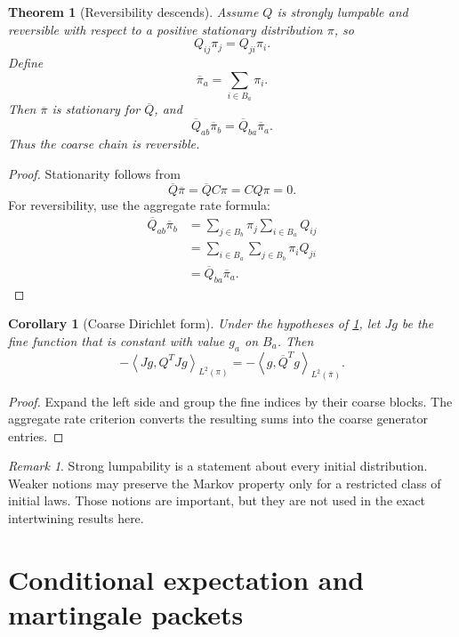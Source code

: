 \documentclass{aomart}
\newtheorem{theorem}{Theorem}[section]
\newtheorem{corollary}[corollary]{Corollary}
\theoremstyle{definition}
\theoremstyle{remark}
\newtheorem{remark}[remark]{Remark}
\newcommand{\ip}[2]{\left\langle#1,#2\right\rangle}
\begin{document}
\begin{theorem}[Reversibility descends]\label{thm:reversibility_descends}
Assume \(Q\) is strongly lumpable and reversible with respect to a positive stationary distribution \(\pi\), so
\[
Q_{ij}\pi_j=Q_{ji}\pi_i.
\]
Define
\[
\overline\pi_a=\sum_{i\in B_a}\pi_i.
\]
Then \(\overline\pi\) is stationary for \(\overline Q\), and
\[
\overline Q_{ab}\overline\pi_b
=
\overline Q_{ba}\overline\pi_a.
\]
Thus the coarse chain is reversible.
\end{theorem}

\begin{proof}
Stationarity follows from
\[
\overline Q\overline\pi
=\overline QC\pi
=CQ\pi=0.
\]
For reversibility, use the aggregate rate formula:
\[
\begin{aligned}
\overline Q_{ab}\overline\pi_b
&=\sum_{j\in B_b}\pi_j\sum_{i\in B_a}Q_{ij}\\
&=\sum_{i\in B_a}\sum_{j\in B_b}\pi_iQ_{ji}\\
&=\overline Q_{ba}\overline\pi_a.
\end{aligned}
\]
\end{proof}

\begin{corollary}[Coarse Dirichlet form]\label{cor:coarse_dirichlet_form}
Under the hypotheses of \cref{thm:reversibility_descends}, let \(Jg\) be the fine function that is constant with value \(g_a\) on \(B_a\). Then
\[
-\ip{Jg}{Q^TJg}_{L^2(\pi)}
=
-\ip{g}{\overline Q^Tg}_{L^2(\overline\pi)}.
\]
\end{corollary}

\begin{proof}
Expand the left side and group the fine indices by their coarse blocks. The aggregate rate criterion converts the resulting sums into the coarse generator entries.
\end{proof}

\begin{remark}
Strong lumpability is a statement about every initial distribution. Weaker notions may preserve the Markov property only for a restricted class of initial laws. Those notions are important, but they are not used in the exact intertwining results here.
\end{remark}

\section{Conditional expectation and martingale packets}\label{sec:conditional}
\end{document}
